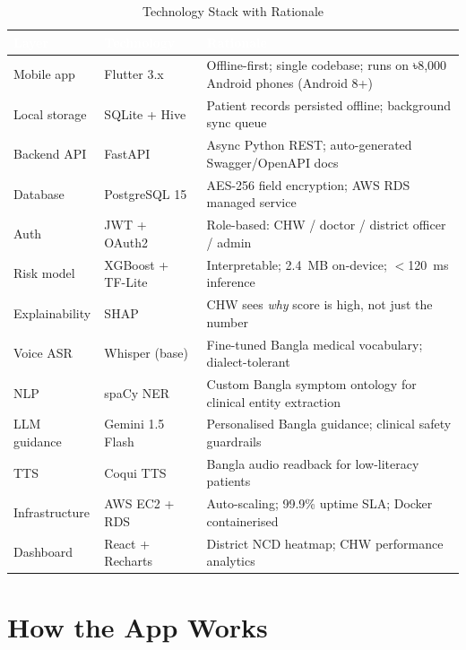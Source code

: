 \documentclass[12pt, a4paper]{article}
\begin{document}
\begin{table}[H]
\centering
\caption{Technology Stack with Rationale}
\small
\begin{tabularx}{\linewidth}{@{}llX@{}}
\toprule
\rowcolor{navycolor}
\textcolor{white}{\textbf{Layer}} &
\textcolor{white}{\textbf{Technology}} &
\textcolor{white}{\textbf{Rationale}} \\
\midrule
Mobile app     & Flutter 3.x    & Offline-first; single codebase; runs on ৳8,000 Android phones (Android 8+) \\
\rowcolor{gray10}
Local storage  & SQLite + Hive  & Patient records persisted offline; background sync queue \\
Backend API    & FastAPI        & Async Python REST; auto-generated Swagger/OpenAPI docs \\
\rowcolor{gray10}
Database       & PostgreSQL 15  & AES-256 field encryption; AWS RDS managed service \\
Auth           & JWT + OAuth2   & Role-based: CHW / doctor / district officer / admin \\
\rowcolor{gray10}
Risk model     & XGBoost + TF-Lite & Interpretable; 2.4~MB on-device; $<$120~ms inference \\
Explainability & SHAP           & CHW sees \emph{why} score is high, not just the number \\
\rowcolor{gray10}
Voice ASR      & Whisper (base) & Fine-tuned Bangla medical vocabulary; dialect-tolerant \\
NLP            & spaCy NER      & Custom Bangla symptom ontology for clinical entity extraction \\
\rowcolor{gray10}
LLM guidance   & Gemini 1.5 Flash & Personalised Bangla guidance; clinical safety guardrails \\
TTS            & Coqui TTS      & Bangla audio readback for low-literacy patients \\
\rowcolor{gray10}
Infrastructure & AWS EC2 + RDS  & Auto-scaling; 99.9\% uptime SLA; Docker containerised \\
Dashboard      & React + Recharts & District NCD heatmap; CHW performance analytics \\
\bottomrule
\end{tabularx}
\end{table}

\section{How the App Works}
\end{document}
